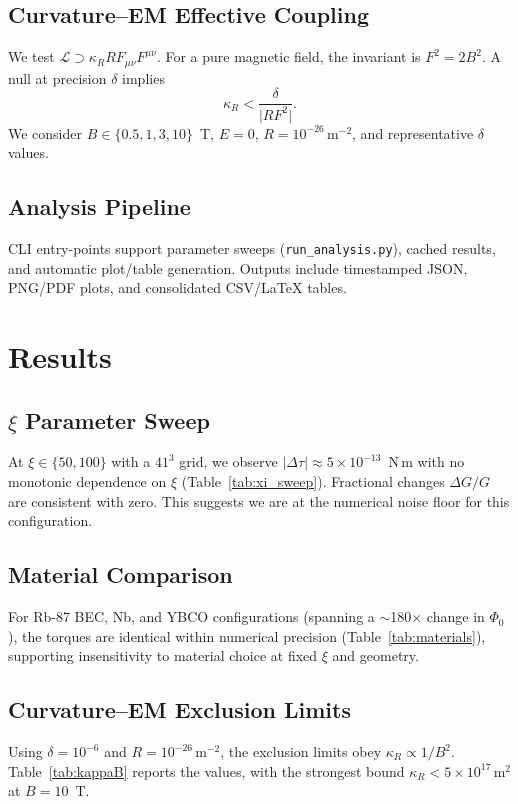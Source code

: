 \documentclass[10pt,twocolumn]{article}
\begin{document}
\subsection{Curvature--EM Effective Coupling}
We test $\mathcal{L} \supset \kappa_R R F_{\mu\nu}F^{\mu\nu}$. For a pure magnetic field, the invariant is $F^2 = 2B^2$. A null at precision $\delta$ implies
\begin{equation}
\kappa_R < \frac{\delta}{\lvert R F^2 \rvert}.
\end{equation}
We consider $B\in\{0.5,1,3,10\}$~T, $E=0$, $R=10^{-26}\,\mathrm{m^{-2}}$, and representative $\delta$ values.

\subsection{Analysis Pipeline}
CLI entry-points support parameter sweeps (\texttt{run\_analysis.py}), cached results, and automatic plot/table generation. Outputs include timestamped JSON, PNG/PDF plots, and consolidated CSV/LaTeX tables.

\section{Results}
\subsection{$\xi$ Parameter Sweep}
At $\xi\in\{50,100\}$ with a $41^3$ grid, we observe $\lvert\Delta\tau\rvert \approx 5\times10^{-13}$~N\,m with no monotonic dependence on $\xi$ (Table~\ref{tab:xi_sweep}). Fractional changes $\Delta G/G$ are consistent with zero. This suggests we are at the numerical noise floor for this configuration.

\subsection{Material Comparison}
For Rb-87 BEC, Nb, and YBCO configurations (spanning a $\sim$180$\times$ change in $\Phi_0$), the torques are identical within numerical precision (Table~\ref{tab:materials}), supporting insensitivity to material choice at fixed $\xi$ and geometry.

\subsection{Curvature--EM Exclusion Limits}
Using $\delta=10^{-6}$ and $R=10^{-26}\,\mathrm{m^{-2}}$, the exclusion limits obey $\kappa_R\propto 1/B^2$. Table~\ref{tab:kappaB} reports the values, with the strongest bound $\kappa_R<5\times10^{17}\,\mathrm{m^2}$ at $B=10$~T.
\end{document}
